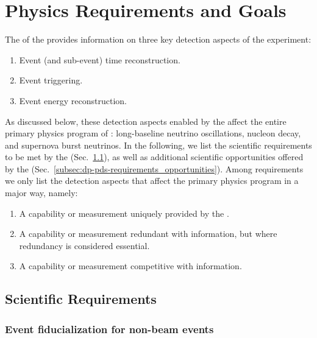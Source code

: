 \section{Physics Requirements and Goals}
\label{sec:dp-pds-requirements}

The  of the   provides information on three key detection aspects of the experiment:

\begin{enumerate}
\item Event (and sub-event) time reconstruction.
\item Event triggering.
\item Event energy reconstruction.
\end{enumerate}

As discussed below, these detection aspects enabled by the  affect the entire primary physics program of : long-baseline neutrino oscillations, nucleon decay, and supernova burst neutrinos. In the following, we list the scientific requirements to be met by the  (Sec.~\ref{subsec:dp-pds-requirements_requirements}), as well as additional scientific opportunities offered by the  (Sec.~\ref{subsec:dp-pds-requirements_opportunities}). Among requirements we only list the  detection aspects that affect the  primary physics program in a major way, namely: 
\begin{enumerate}
\item A capability or measurement uniquely provided by the .
\item A capability or measurement redundant with  information, but where redundancy is considered essential.
\item A capability or measurement competitive with  information.
\end{enumerate}


\subsection{Scientific Requirements}
\label{subsec:dp-pds-requirements_requirements}

\subsubsection{Event fiducialization for non-beam events}

